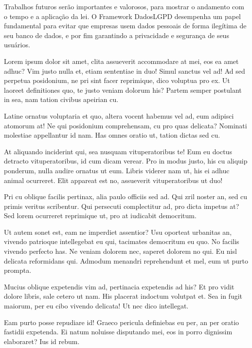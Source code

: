 \documentclass[
	12pt,				%
	openright,			%
	oneside,			%
	a4paper,			%
	english,			%
	french,				%
	spanish,			%
	brazil,				%
	]{abntex2}
\begin{document}
Trabalhos futuros serão importantes e valorosos, para mostrar o andamento com o tempo e a aplicação da lei. O Framework DadosLGPD desempenha um papel fundamental para evitar que empresas usem dados pessoais de forma ilegítima de seu banco de dados, e por fim garantindo a privacidade e segurança de seus usuários.


Lorem ipsum dolor sit amet, clita assueverit accommodare at mei, eos ea amet adhuc? Vim justo nulla et, etiam sententiae in duo! Simul sanctus vel ad! Ad sed perpetua posidonium, ne pri sint facer reprimique, dico voluptua pro ex. Ut laoreet definitiones quo, te justo veniam dolorum his? Partem semper postulant in sea, nam tation civibus apeirian cu.

Latine ornatus voluptaria et quo, altera vocent habemus vel ad, eum adipisci atomorum at! Ne qui posidonium comprehensam, cu pro quas delicata? Nominati molestiae appellantur id nam. Has omnes oratio ut, tation dictas sed cu.

At aliquando inciderint qui, sea nusquam vituperatoribus te! Eum eu doctus detracto vituperatoribus, id cum dicam verear. Pro in modus justo, his cu aliquip ponderum, nulla audire ornatus ut eum. Libris viderer nam ut, his ei adhuc animal ocurreret. Elit appareat est no, assueverit vituperatoribus ut duo!

Pri cu oblique facilis pertinax, alia paulo officiis sed ad. Qui zril noster an, sed cu primis veritus scribentur. Qui persecuti complectitur ad, pro dicta impetus at? Sed lorem ocurreret reprimique ut, pro at iudicabit democritum.

Ut autem sonet est, eam ne imperdiet assentior? Usu oporteat urbanitas an, vivendo patrioque intellegebat eu qui, tacimates democritum eu quo. No facilis vivendo perfecto has. Ne veniam dolorem nec, saperet dolorem no qui. Eu nisl delicata reformidans qui. Admodum menandri reprehendunt et mel, eum ut purto prompta.

Mucius oblique expetendis vim ad, pertinacia expetendis ad his? Et pro vidit dolore libris, sale cetero ut nam. His placerat indoctum volutpat et. Sea in fugit maiorum, per eu cibo vivendo delicata! Ut nec dico intellegat.



Eam purto posse repudiare id! Graeco pericula definiebas eu per, an per oratio fastidii expetenda. Ei natum noluisse disputando mei, eos in porro dignissim elaboraret? Ius id rebum.

\end{document}
